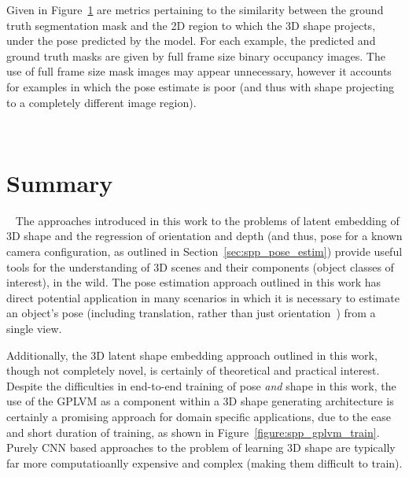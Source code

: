 Given in Figure~\ref{figure:spp_shape_roc} are metrics pertaining to the similarity between the ground truth segmentation mask and the 2D region to 
which the 3D shape projects, under the pose predicted by the model. For each example, the predicted and ground truth masks are 
given by full frame size binary occupancy images. The use of full frame size mask images may appear unnecessary, however it accounts 
for examples in which the pose estimate is poor (and thus with shape projecting to a completely different image region).

\begin{figure}[!htbp]
  \centering
  \caption[Shape Prediction ROC]{}
~\label{figure:spp_shape_roc}
\end{figure}
\fi

\section{Summary}
~\label{sec:spp_discussion}
The approaches introduced in this work to the problems of latent embedding of 3D shape and the regression of orientation and 
depth (and thus, pose for a known camera configuration, as outlined in Section~\ref{sec:spp_pose_estim}) provide useful tools 
for the understanding of 3D scenes and their components (object classes of interest), in the wild. The pose estimation approach 
outlined in this work has direct potential application in many scenarios in which it is necessary to estimate an object's pose 
(including translation, rather than just orientation~\cite{Braun2016}) from a single view.

Additionally, the 3D latent shape embedding approach outlined in this work, though not completely novel, is certainly of theoretical 
and practical interest. Despite the difficulties in end-to-end training of pose \textit{and} shape in this work, the use of the GPLVM 
as a component within a 3D shape generating architecture is certainly a promising approach for domain specific applications, due to 
the ease and short duration of training, as shown in Figure~\ref{figure:spp_gplvm_train}. Purely CNN based approaches to the problem 
of learning 3D shape are typically far more computatioanlly expensive and complex (making them difficult to train).